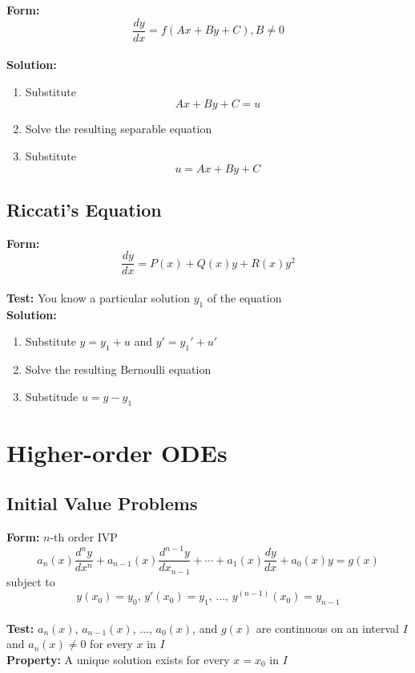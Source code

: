 \documentclass{article}
\begin{document}
\textbf{Form:} \[\frac{d y}{d x} = f(A x + B y + C), B \ne 0\] \\ \textbf{Solution:} \begin{enumerate}
  \item Substitute \[A x + B y + C = u\]

  \item Solve the resulting separable equation

  \item Substitute \[u = A x + B y + C\]
\end{enumerate}

\subsection{Riccati's Equation}

\textbf{Form:} \[\frac{dy}{dx} = P(x) + Q(x) y + R(x) y^2\] \\ \textbf{Test:} You know a particular solution $y_1$ of the equation \\ \textbf{Solution:} \begin{enumerate}
  \item Substitute $y = y_1 + u$ and $y' = y_1' + u'$

  \item Solve the resulting Bernoulli equation

  \item Substitude $u = y - y_1$
\end{enumerate}

\section{Higher-order ODEs}

\subsection{Initial Value Problems}

\textbf{Form:} $n$-th order IVP \[a_n(x) \frac{d^ny}{dx^n} + a_{n - 1}(x) \frac{d^{n - 1}y}{dx_{n - 1}} + \cdots + a_1(x) \frac{dy}{dx} + a_0(x) y = g(x)\] subject to \[y(x_0) = y_0, \,y'(x_0) = y_1, \,\ldots, \,y^{(n - 1)}(x_0) = y_{n - 1}\] \\ \textbf{Test:} $a_n(x)$, $a_{n - 1}(x)$, $\ldots$, $a_0(x)$, and $g(x)$ are continuous on an interval $I$ and $a_n(x) \ne 0$ for every $x$ in $I$ \\ \textbf{Property:} A unique solution exists for every $x = x_0$ in $I$
\end{document}

